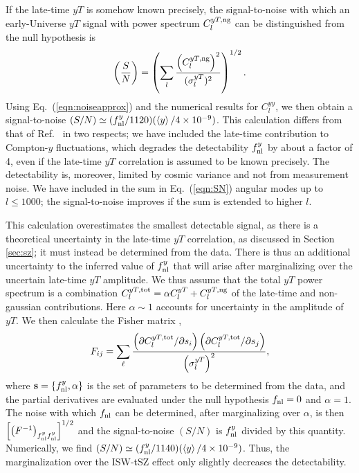 \documentclass[aps,twocolumn,floats,prd,nofootinbib,10pt,floatfix]{revtex4-1}
\def\VEV#1{\left\langle #1 \right\rangle}
\begin{document}
If the late-time $yT$ is somehow known precisely, the
signal-to-noise with which an early-Universe $yT$ signal with
power spectrum $C_l^{yT,{\rm ng}}$ can be distinguished from the
null hypothesis is
\begin{equation}
     \left(\frac{S}{N} \right) = \left(\sum_l\frac{\left(C_l^{yT,{\rm ng}}
     \right)^2}{(\sigma_l^{yT})^2}\right)^{1/2}.
\label{eqn:SN}
\end{equation}
Using Eq.~(\ref{eqn:noiseapprox}) and the numerical results for
$C_l^{yy}$, we then obtain a signal-to-noise $(S/N) \simeq  (f_{\rm
nl}^y/1120) (\VEV{y}/4\times 10^{-9})$.  This calculation differs from 
that of Ref.~\cite{Emami:2015xqa} in two respects; we have included
the late-time contribution to Compton-$y$ fluctuations, which
degrades the detectability $f_{\rm nl}^y$ by about a factor of 4,
even if the late-time $yT$
correlation is assumed to be known precisely.  The
detectability is, moreover,
limited by cosmic variance and not from measurement noise.
We have included in the sum in Eq.~(\ref{eqn:SN}) angular
modes up to $l \leq 1000$; the signal-to-noise improves if the
sum is extended to higher $l$.

This calculation overestimates the smallest detectable
signal, as there is a theoretical uncertainty in the late-time
$yT$ correlation, as discussed in Section \ref{sec:sz}; it must
instead be determined from the data.  There is thus an
additional uncertainty to the inferred value of $f_{\rm nl}^y$
that will arise after marginalizing over the uncertain late-time
$yT$ amplitude.  We thus assume that the total $yT$ power
spectrum is a combination $C_l^{yT,{\rm tot}} = \alpha C_l^{yT}+
C_l^{yT,{\rm ng}}$ of the late-time and non-gaussian
contributions.  Here $\alpha \sim 1$ accounts for uncertainty in
the amplitude of $yT$.
We then calculate the Fisher matrix
\cite{Jungman:1995bz},
\begin{equation}
     F_{ij} = \sum_\ell \frac{\left( \partial C_l^{yT,{\rm
     tot}}/\partial s_i \right) \left( \partial C_l^{yT,{\rm tot}}/\partial
     s_j\right)}{\left(\sigma_l^{yT} \right)^2},
\label{eqn:fisher}
\end{equation}
where $\mathbf{s} = \{f_{\rm nl}^y,\alpha\}$ is the set of
parameters to be determined from the data, and the
partial derivatives are evaluated under the null hypothesis
$f_{\rm nl}=0$ and $\alpha = 1$.  The noise with which $f_{\rm nl}$ can be
determined, after marginalizing over $\alpha$, is then
$\left[\left(F^{-1} \right)_{f_{\rm nl}^y f_{\rm nl}^y}
\right]^{1/2}$ and the signal-to-noise $(S/N)$ is $f_{\rm nl}^y$
divided by this quantity.  Numerically, we find $(S/N) \simeq
(f_{\rm nl}^y/1140)( \VEV{y} / 4\times 10^{-9})$.  Thus, the
marginalization over the ISW-tSZ effect only slightly decreases 
the detectability.
\end{document}
